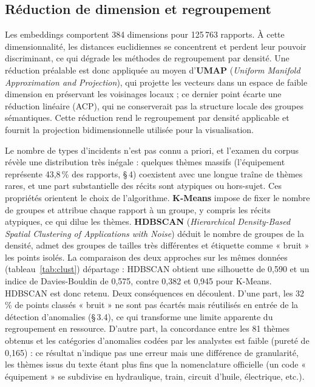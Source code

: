 \documentclass[11pt,a4paper]{article}
\begin{document}
\subsection{Réduction de dimension et regroupement}
Les embeddings comportent 384 dimensions pour 125\,763 rapports. À cette dimensionnalité, les
distances euclidiennes se concentrent et perdent leur pouvoir discriminant, ce qui dégrade les
méthodes de regroupement par densité. Une réduction préalable est donc appliquée au moyen
d'\textbf{UMAP} (\emph{Uniform Manifold Approximation and Projection}), qui projette les
vecteurs dans un espace de faible dimension en préservant les voisinages locaux ; ce dernier
point écarte une réduction linéaire (ACP), qui ne conserverait pas la structure locale des
groupes sémantiques. Cette réduction rend le regroupement par densité applicable et fournit la
projection bidimensionnelle utilisée pour la visualisation.

Le nombre de types d'incidents n'est pas connu a priori, et l'examen du corpus révèle une
distribution très inégale : quelques thèmes massifs (l'équipement représente 43,8\,\% des
rapports, \S\,4) coexistent avec une longue traîne de thèmes rares, et une part substantielle
des récits sont atypiques ou hors-sujet. Ces propriétés orientent le choix de l'algorithme.
\textbf{K-Means} impose de fixer le nombre de groupes et attribue chaque rapport à un groupe,
y compris les récits atypiques, ce qui dilue les thèmes. \textbf{HDBSCAN} (\emph{Hierarchical
Density-Based Spatial Clustering of Applications with Noise}) déduit le nombre de groupes de
la densité, admet des groupes de tailles très différentes et étiquette comme « bruit » les
points isolés. La comparaison des deux approches sur les mêmes données (tableau~\ref{tab:clust})
départage : HDBSCAN obtient une silhouette de 0,590 et un indice de Davies-Bouldin de 0,575,
contre 0,382 et 0,945 pour K-Means. HDBSCAN est donc retenu. Deux conséquences en découlent.
D'une part, les 32\,\% de points classés « bruit » ne sont pas écartés mais réutilisés en
entrée de la détection d'anomalies (\S\,3.4), ce qui transforme une limite apparente du
regroupement en ressource. D'autre part, la concordance entre les 81 thèmes obtenus et les
catégories d'anomalies codées par les analystes est faible (pureté de 0,165) : ce résultat
n'indique pas une erreur mais une différence de granularité, les thèmes issus du texte étant
plus fins que la nomenclature officielle (un code « équipement » se subdivise en hydraulique,
train, circuit d'huile, électrique, etc.).
\end{document}
